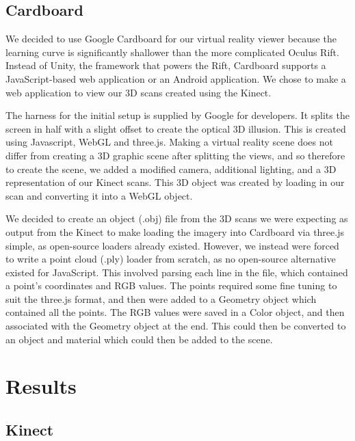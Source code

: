 \documentclass[11pt,oneside,english]{article}
\begin{document}
\subsection{Cardboard}

We decided to use Google Cardboard for our virtual reality viewer because the
learning curve is significantly shallower than the more complicated Oculus Rift.
Instead of Unity, the framework that powers the Rift, Cardboard supports a
JavaScript-based web application or an Android application. We chose to make a
web application to view our 3D scans created using the Kinect.

The harness for the initial setup is supplied by Google for developers. It
splits the screen in half with a slight offset to create the optical 3D
illusion. This is created using Javascript, WebGL and three.js. Making a virtual
reality scene does not differ from creating a 3D graphic scene after splitting
the views, and so therefore to create the scene, we added a modified camera,
additional lighting, and a 3D representation of our Kinect scans. This 3D object
was created by loading in our scan and converting it into a WebGL object. 

We decided to create an object (.obj) file from the 3D scans we were expecting
as output from the Kinect to make loading the imagery into Cardboard via
three.js simple, as open-source loaders already existed. However, we instead
were forced to write a point cloud (.ply) loader from scratch, as no open-source
alternative existed for JavaScript. This involved parsing each line in the file,
which contained a point's coordinates and RGB values. The points required some
fine tuning to suit the three.js format, and then were added to a Geometry
object which contained all the points. The RGB values were saved in a Color
object, and then associated with the Geometry object at the end. This could then
be converted to an object and material which could then be added to the scene.

\section{Results}

\subsection{Kinect}
\end{document}
